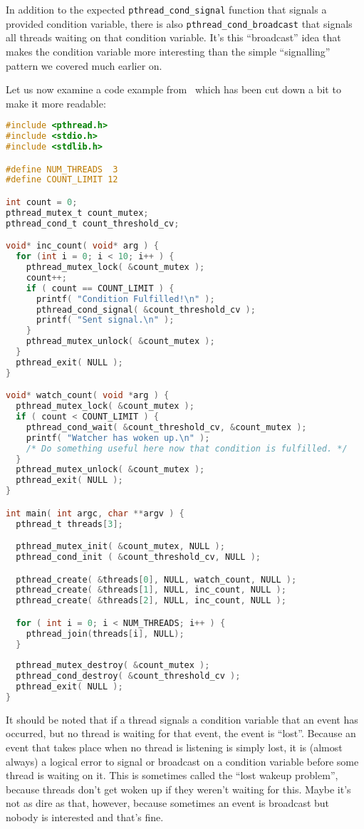 In addition to the expected \texttt{pthread\_cond\_signal} function that signals a provided condition variable, there is also \texttt{pthread\_cond\_broadcast} that signals all threads waiting on that condition variable. It's this ``broadcast'' idea that makes the condition variable more interesting than the simple ``signalling'' pattern we covered much earlier on.


Let us now examine a code example from~\cite{pthreads} which has been cut down a bit to make it more readable:

\begin{lstlisting}[language=C]
#include <pthread.h>
#include <stdio.h>
#include <stdlib.h>

#define NUM_THREADS  3
#define COUNT_LIMIT 12

int count = 0;
pthread_mutex_t count_mutex;
pthread_cond_t count_threshold_cv;

void* inc_count( void* arg ) {
  for (int i = 0; i < 10; i++ ) {
    pthread_mutex_lock( &count_mutex );
    count++;
    if ( count == COUNT_LIMIT ) {
      printf( "Condition Fulfilled!\n" );
      pthread_cond_signal( &count_threshold_cv );
      printf( "Sent signal.\n" );
    }
    pthread_mutex_unlock( &count_mutex );
  }
  pthread_exit( NULL );
}

void* watch_count( void *arg ) {
  pthread_mutex_lock( &count_mutex );  
  if ( count < COUNT_LIMIT ) {
    pthread_cond_wait( &count_threshold_cv, &count_mutex );
    printf( "Watcher has woken up.\n" );
    /* Do something useful here now that condition is fulfilled. */
  }
  pthread_mutex_unlock( &count_mutex );
  pthread_exit( NULL );
}

int main( int argc, char **argv ) {
  pthread_t threads[3];

  pthread_mutex_init( &count_mutex, NULL );
  pthread_cond_init ( &count_threshold_cv, NULL );

  pthread_create( &threads[0], NULL, watch_count, NULL );
  pthread_create( &threads[1], NULL, inc_count, NULL );
  pthread_create( &threads[2], NULL, inc_count, NULL );

  for ( int i = 0; i < NUM_THREADS; i++ ) {
    pthread_join(threads[i], NULL);
  }
  
  pthread_mutex_destroy( &count_mutex );
  pthread_cond_destroy( &count_threshold_cv );
  pthread_exit( NULL );
}
\end{lstlisting}

It should be noted that if a thread signals a condition variable that an event has occurred, but no thread is waiting for that event, the event is ``lost''.  Because an event that takes place when no thread is listening is simply lost, it is (almost always) a logical error to signal or broadcast on a condition variable before some thread is waiting on it. This is sometimes called the ``lost wakeup problem'', because threads don't get woken up if they weren't waiting for this. Maybe it's not as dire as that, however, because sometimes an event is broadcast but nobody is interested and that's fine. 

